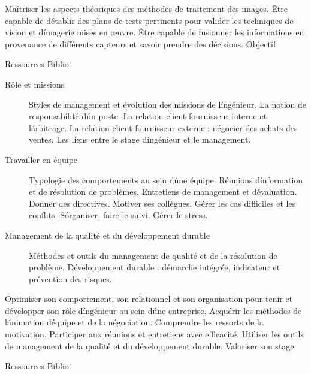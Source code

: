 {} 
{\begin{itemize}
\ObjItem Maîtriser les aspects théoriques des méthodes de traitement des images.
\ObjItem Être capable de d\'établir des plans de tests pertinents pour valider les techniques de vision et d\'imagerie mises en \oe uvre.
\ObjItem Être capable de fusionner les informations en provenance de différents capteurs et savoir prendre des décisions.
\ObjItem Objectif
\end{itemize} 
} 
{Ressources} 
{Biblio} 
 
\vfill

{
\begin{description}
\item[Rôle et missions]
Styles de management et évolution des missions de l\'ingénieur. La notion de responsabilité d\'un poste. 
La relation client-fournisseur interne et l\'arbitrage. La relation client-fournisseur externe : négocier des achats des ventes.
Les liens entre le stage d\'ingénieur et le management.
\item[Travailler en équipe]
Typologie des comportements au sein d\'une équipe. Réunions d\'information et de résolution de problèmes. 
Entretiens de management et d\'évaluation. Donner des directives. Motiver ses collègues. Gérer les cas difficiles et les conflits. 
S\'organiser, faire le suivi. Gérer le stress.
\item[Management de la qualité et du développement durable]
Méthodes et outils du management de qualité et de la résolution de problème. Développement durable : 
démarche intégrée, indicateur et prévention des risques.
\end{description}
} 
{} 
{\begin{itemize}
\ObjItem Optimiser son comportement, son relationnel et son organisation pour tenir et développer son rôle d\'ingénieur au sein d\'une entreprise.
\ObjItem Acquérir les méthodes de l\'animation d\'équipe et de la négociation.
\ObjItem Comprendre les ressorts de la motivation.
\ObjItem Participer aux réunions et entretiens avec efficacité.
\ObjItem Utiliser les outils de management de la qualité et du développement durable.
\ObjItem Valoriser son stage.
\end{itemize} 
} 
{Ressources} 
{Biblio} 
 
